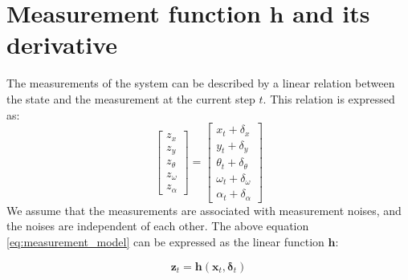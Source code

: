 \documentclass[12pt, a4paper]{article}
\begin{document}
\section{Measurement function $\bm{h}$ and its derivative}
The measurements of the system can be described by a linear relation between the state and the measurement at the current step $t$. This relation is expressed as:
\begin{equation}
  \label{eq:measurement_model}
  \begin{bmatrix}
    z_{x}\\
    z_{y}\\
    z_{\theta}\\
    z_{\omega}\\
    z_{\alpha}
  \end{bmatrix}=
  \begin{bmatrix}
    x_{t} + \delta_{x}\\
    y_{t} + \delta_{y}\\
    \theta_{t} + \delta_{\theta}\\
    \omega_{t} + \delta_{\omega}\\
    \alpha_{t} + \delta_{\alpha}
  \end{bmatrix}
\end{equation}
We assume that the measurements are associated with measurement noises, and the noises are independent of each other. The above equation \eqref{eq:measurement_model} can be expressed as the linear function $\bm{h}$:

\[
  \bm{z}_{t} = \bm{h}(\bm{x}_{t}, \bm{\delta}_{t})
\]
\end{document}

